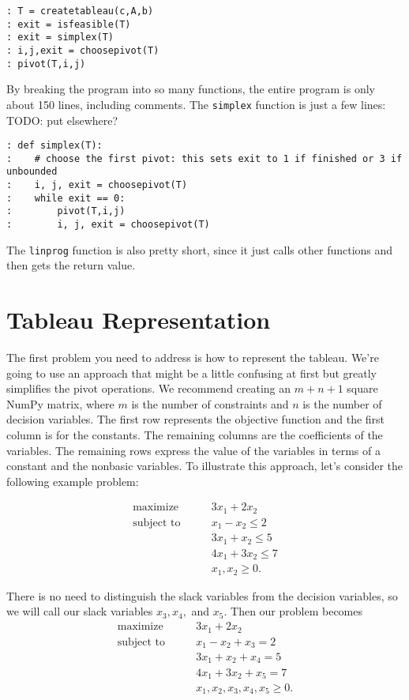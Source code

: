 \begin{lstlisting}[style=python]
: T = createtableau(c,A,b)
: exit = isfeasible(T)
: exit = simplex(T)
: i,j,exit = choosepivot(T)
: pivot(T,i,j)
\end{lstlisting}


By breaking the program into so many functions, the entire program is only about 150 lines, including comments.  The {\tt simplex} function is just a few lines:
TODO: put elsewhere?
\begin{lstlisting}[style=python]
: def simplex(T):
:    # choose the first pivot: this sets exit to 1 if finished or 3 if unbounded
:    i, j, exit = choosepivot(T)
:    while exit == 0:
:        pivot(T,i,j)
:        i, j, exit = choosepivot(T)
\end{lstlisting}
The {\tt linprog} function is also pretty short, since it just calls other functions and then gets the return value.

\section{Tableau Representation}

The first problem you need to address is how to represent the tableau. We're going to use an approach that might be a little confusing at first but greatly simplifies the pivot operations. We recommend creating an $m + n + 1$ square NumPy matrix, where $m$ is the number of constraints and $n$ is the number of decision variables.  The first row represents the objective function and the first column is for the constants. The remaining columns are the coefficients of the variables. The remaining rows express the value of the variables in terms of a constant and the nonbasic variables. To illustrate this approach, let's consider the following example problem:

\begin{align*}
	\mbox{maximize}\qquad
        &    3x_1 + 2x_2 \\
	\mbox{subject to}\qquad
        &     x_1 - x_2 \leq 2 \\
		&	 3x_1 + x_2 \leq 5 \\
		&	 4x_1 + 3x_2 \leq 7 \\
		&     x_1, x_2 \geq 0.
\end{align*}

There is no need to distinguish the slack variables from the decision variables, so we will call our slack variables $x_3, x_4,$ and $x_5$. Then our problem becomes
\begin{align*}
	\mbox{maximize}\qquad
        &    3x_1 + 2x_2 \\
	\mbox{subject to}\qquad
        &     x_1 - x_2 + x_3 = 2 \\
		&	 3x_1 + x_2 + x_4 = 5 \\
		&	 4x_1 + 3x_2 + x_5 = 7 \\
		&     x_1, x_2, x_3, x_4, x_5 \geq 0.
\end{align*}

